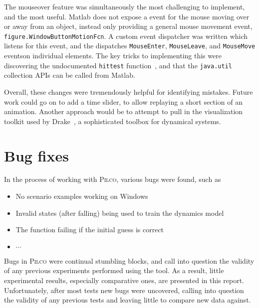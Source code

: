 \documentclass[main.tex]{subfiles}
\begin{document}
	The mouseover feature was simultaneously the most challenging to implement, and the most useful.
	Matlab does not expose a event for the mouse moving over or away from an object, instead only providing a general mouse movement event, \texttt{figure.WindowButtonMotionFcn}.
	A custom event dispatcher was written which listens for this event, and the dispatches \texttt{MouseEnter}, \texttt{MouseLeave}, and \texttt{MouseMove} events\footnotemark on individual elements.
	The key tricks to implementing this were discovering the undocumented \texttt{hittest} function~\cite{matlab-hittest}, and that the \texttt{java.util} collection APIs can be called from Matlab.


	Overall, these changes were tremendously helpful for identifying mistakes.
	Future work could go on to add a time slider, to allow replaying a short section of an animation. Another approach would be to attempt to pull in the visualization toolkit used by Drake~\cite{drake}, a sophisticated toolbox for dynamical systems.


\section{Bug fixes}

	In the process of working with \textsc{Pilco}, various bugs were found, such as
	\begin{itemize}
		\item No scenario examples working on Windows
		\item Invalid states (after falling) being used to train the dynamics model
		\item The  function failing if the initial guess is correct
		\item $\cdots$
	\end{itemize}
	Bugs in \textsc{Pilco} were continual stumbling blocks, and call into question the validity of any previous experiments performed using the tool.
	As a result, little experimental results, especially comparative ones, are presented in this report.
	Unfortunately, after most tests new bugs were uncovered, calling into question the validity of any previous tests and leaving little to compare new data against.


\bib
\end{document}
